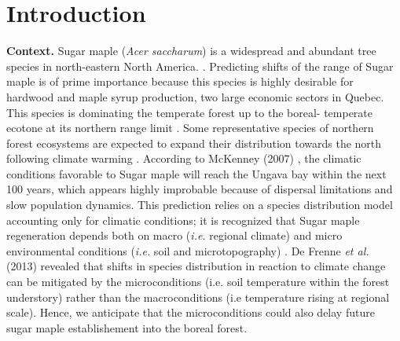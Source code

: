 


\newpage
\setcounter{page}{1}

\section{Introduction}

\textbf{Context.} Sugar maple (\textit{Acer saccharum}) is a widespread and
abundant tree species in north-eastern North America.
\cite{Graignic2013,Messaoud2007,Kellman2004,Barras1998}. Predicting shifts of
the range of Sugar maple is of prime importance because this species is highly
desirable for hardwood and maple syrup production, two large economic sectors
in Quebec. This species is dominating the temperate forest up to the boreal-
temperate  ecotone at its northern range limit \cite{Barras1998}. Some
representative species of northern forest ecosystems are expected to expand
their distribution towards the north following climate warming
\cite{Sciences2014,Iverson2002}. According to McKenney (2007)
\cite{Sciences2014}, the climatic conditions  favorable to Sugar maple  will
reach the Ungava bay within the next 100 years, which appears highly
improbable because of dispersal limitations and slow population dynamics. This
prediction relies on a species distribution model accounting only for climatic
conditions; it is recognized that Sugar maple regeneration depends both on
macro  (\textit{i.e.} regional climate) and micro environmental conditions
(\textit{i.e.} soil and microtopography) \cite{Graignic2013,Lafleur2010}. De
Frenne \textit{et al.} (2013) revealed that shifts in species distribution in
reaction to climate change can be mitigated by the microconditions (i.e. soil
temperature within the forest understory) rather than the macroconditions (i.e
temperature rising at regional scale). Hence, we anticipate that the
microconditions could also delay future sugar maple establishement into the
boreal forest.\\

